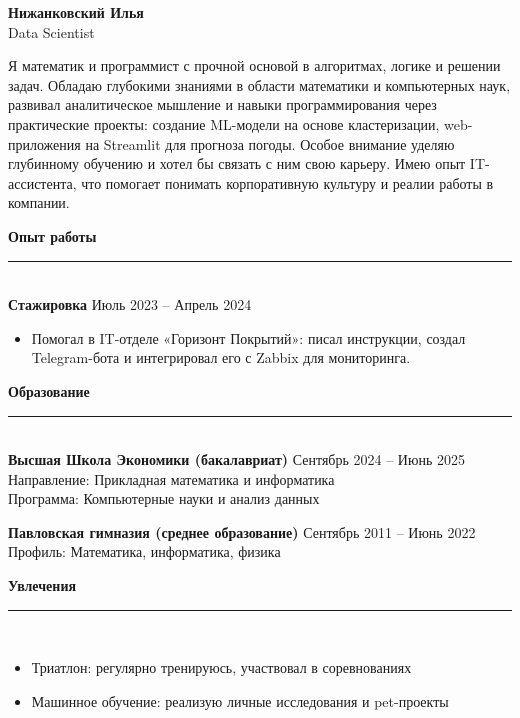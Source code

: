 \documentclass[10pt,a4paper]{article}
\begin{document}
\hfill%
\begin{minipage}[t]{0.58\textwidth}
    {\huge\bfseries Нижанковский Илья}\\[0.3em]
    {\large Data Scientist}

    \vspace{1em}
    Я математик и программист с прочной основой в алгоритмах, логике и решении задач. 
    Обладаю глубокими знаниями в области математики и компьютерных наук, развивал 
    аналитическое мышление и навыки программирования через практические проекты: 
    создание ML-модели на основе кластеризации, web-приложения на Streamlit для 
    прогноза погоды. Особое внимание уделяю глубинному обучению и хотел бы 
    связать с ним свою карьеру. Имею опыт IT-ассистента, что помогает понимать 
    корпоративную культуру и реалии работы в компании.

    \vspace{1.2em}
    {\large\bfseries Опыт работы}\\[-0.2em]
    \rule{\linewidth}{0.4pt}\\[0.4em]
    {\bfseries Стажировка} \hfill Июль 2023 – Апрель 2024\\
    \begin{itemize}[leftmargin=*]\itemsep0pt
        \item Помогал в IT-отделе «Горизонт Покрытий»: писал инструкции, создал Telegram-бота и интегрировал его с Zabbix для мониторинга.
    \end{itemize}

    \vspace{0.8em}
    {\large\bfseries Образование}\\[-0.2em]
    \rule{\linewidth}{0.4pt}\\[0.6em]

    {\bfseries Высшая Школа Экономики (бакалавриат)} \hfill Сентябрь 2024 – Июнь 2025\\
    Направление: Прикладная математика и информатика\\
    Программа: Компьютерные науки и анализ данных

    \vspace{0.8em}
    {\bfseries Павловская гимназия (среднее образование)} \hfill Сентябрь 2011 – Июнь 2022\\
    Профиль: Математика, информатика, физика

    \vspace{1em}
    {\large\bfseries Увлечения}\\[-0.2em]
    \rule{\linewidth}{0.4pt}\\[0.4em]
    \begin{itemize}[leftmargin=*]\itemsep0pt
        \item Триатлон: регулярно тренируюсь, участвовал в соревнованиях
        \item Машинное обучение: реализую личные исследования и pet-проекты
    \end{itemize}
\end{minipage}
\end{document}
